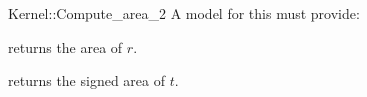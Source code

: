 \begin{ccRefFunctionObjectConcept}{Kernel::Compute_area_2}
A model for this must provide:


       {returns the area of $r$. }

       {returns the signed area of $t$. }

\end{ccRefFunctionObjectConcept}
